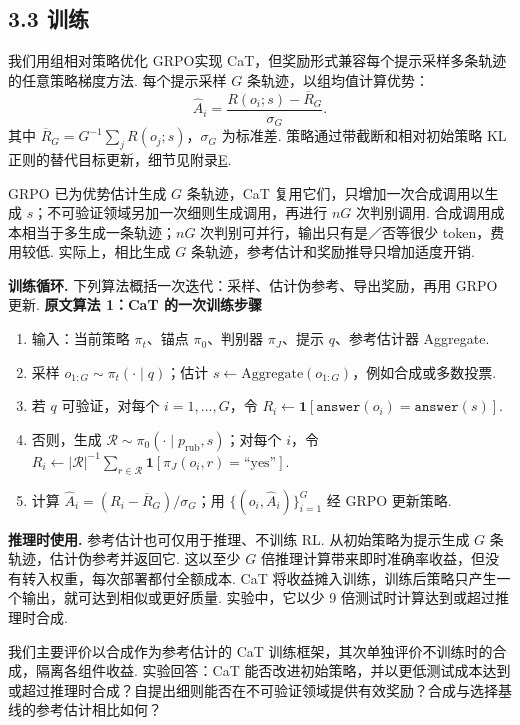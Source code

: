 \subsection*{3.3 训练}
我们用组相对策略优化 GRPO\cite{cat-shao2024deepseekmath}实现 CaT，但奖励形式兼容每个提示采样多条轨迹的任意策略梯度方法. 每个提示采样 $G$ 条轨迹，以组均值计算优势：
\begin{equation}
\widehat A_i=\frac{R(o_i;s)-\overline R_G}{\sigma_G}.\label{cat-eq:advantage}
\end{equation}
其中 $\overline R_G=G^{-1}\sum_jR(o_j;s)$，$\sigma_G$ 为标准差. 策略通过带截断和相对初始策略 KL 正则的替代目标更新，细节见附录\hyperref[cat-app:grpo]{E}.

GRPO 已为优势估计生成 $G$ 条轨迹，CaT 复用它们，只增加一次合成调用以生成 $s$；不可验证领域另加一次细则生成调用，再进行 $nG$ 次判别调用. 合成调用成本相当于多生成一条轨迹；$nG$ 次判别可并行，输出只有是／否等很少 token，费用较低. 实际上，相比生成 $G$ 条轨迹，参考估计和奖励推导只增加适度开销.

\textbf{训练循环.} 下列算法概括一次迭代：采样、估计伪参考、导出奖励，再用 GRPO 更新.
\label{cat-alg:cat-rl}
\noindent\textbf{原文算法 1：CaT 的一次训练步骤}
\begin{enumerate}
\item 输入：当前策略 $\pi_t$、锚点 $\pi_0$、判别器 $\pi_J$、提示 $q$、参考估计器 Aggregate.
\item 采样 $o_{1:G}\sim\pi_t(\cdot\mid q)$；估计 $s\leftarrow\mathrm{Aggregate}(o_{1:G})$，例如合成或多数投票.
\item 若 $q$ 可验证，对每个 $i=1,\ldots,G$，令 $R_i\leftarrow\mathbf1[\texttt{answer}(o_i)=\texttt{answer}(s)]$.
\item 否则，生成 $\mathcal R\sim\pi_0(\cdot\mid p_{\mathrm{rub}},s)$；对每个 $i$，令 $R_i\leftarrow|\mathcal R|^{-1}\sum_{r\in\mathcal R}\mathbf1[\pi_J(o_i,r)=\text{``yes''}]$.
\item 计算 $\widehat A_i=(R_i-\overline R_G)/\sigma_G$；用 $\{(o_i,\widehat A_i)\}_{i=1}^G$ 经 GRPO 更新策略.
\end{enumerate}

\textbf{推理时使用.} 参考估计也可仅用于推理、不训练 RL. 从初始策略为提示生成 $G$ 条轨迹，估计伪参考并返回它. 这以至少 $G$ 倍推理计算带来即时准确率收益，但没有转入权重，每次部署都付全额成本. CaT 将收益摊入训练，训练后策略只产生一个输出，就可达到相似或更好质量. 实验中，它以少 9 倍测试时计算达到或超过推理时合成.

我们主要评价以合成作为参考估计的 CaT 训练框架，其次单独评价不训练时的合成，隔离各组件收益. 实验回答：CaT 能否改进初始策略，并以更低测试成本达到或超过推理时合成？自提出细则能否在不可验证领域提供有效奖励？合成与选择基线的参考估计相比如何？

